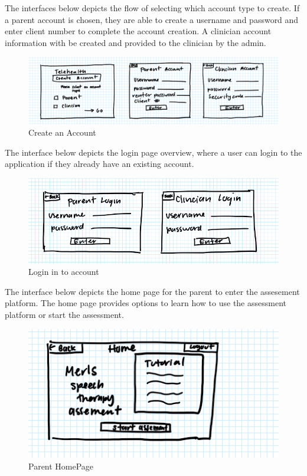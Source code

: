 \documentclass[12pt, titlepage]{article}
\begin{document}
\hspace{1.5em}The interfaces below depicts the flow of selecting which account type to create. If a parent account is chosen, they are able to create a username and password and enter client number to complete the account creation. A clinician account information with be created and provided to the clinician by the admin.
\begin{figure}[H]
  \centering
  \includegraphics[scale=0.8]{images/create account.png}
  \caption{Create an Account}
\end{figure}

\hspace{1.5em}The interface below depicts the login page overview, where a user can login to the application if they already have an existing account.
\begin{figure}[H]
  \centering
  \includegraphics[scale=0.9]{images/loginaccount.png}
  \caption{Login in to account}
\end{figure}

\hspace{1.5em}The interface below depicts the home page for the parent to enter the assesement platform. The home page provides options to learn how to use the assessment platform or start the assessment. 
\begin{figure}[H]
  \centering
  \includegraphics[scale=0.9]{images/homepage.png}
  \caption{Parent HomePage}
\end{figure}
\end{document}
